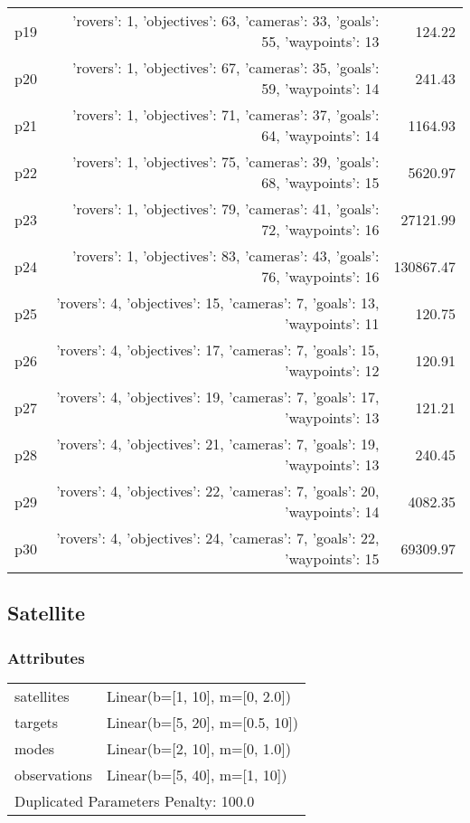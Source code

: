 \documentclass{article}
\begin{document}
\begin{center}
\begin{tabular}{@{}l|r|r@{}}
  p19&{'rovers': 1, 'objectives': 63, 'cameras': 33, 'goals': 55, 'waypoints': 13}&124.22\\
  p20&{'rovers': 1, 'objectives': 67, 'cameras': 35, 'goals': 59, 'waypoints': 14}&241.43\\
  p21&{'rovers': 1, 'objectives': 71, 'cameras': 37, 'goals': 64, 'waypoints': 14}&1164.93\\
  p22&{'rovers': 1, 'objectives': 75, 'cameras': 39, 'goals': 68, 'waypoints': 15}&5620.97\\
  p23&{'rovers': 1, 'objectives': 79, 'cameras': 41, 'goals': 72, 'waypoints': 16}&27121.99\\
  p24&{'rovers': 1, 'objectives': 83, 'cameras': 43, 'goals': 76, 'waypoints': 16}&130867.47\\
  p25&{'rovers': 4, 'objectives': 15, 'cameras': 7, 'goals': 13, 'waypoints': 11}&120.75\\
  p26&{'rovers': 4, 'objectives': 17, 'cameras': 7, 'goals': 15, 'waypoints': 12}&120.91\\
  p27&{'rovers': 4, 'objectives': 19, 'cameras': 7, 'goals': 17, 'waypoints': 13}&121.21\\
  p28&{'rovers': 4, 'objectives': 21, 'cameras': 7, 'goals': 19, 'waypoints': 13}&240.45\\
  p29&{'rovers': 4, 'objectives': 22, 'cameras': 7, 'goals': 20, 'waypoints': 14}&4082.35\\
  p30&{'rovers': 4, 'objectives': 24, 'cameras': 7, 'goals': 22, 'waypoints': 15}&69309.97
                            \end{tabular}
                            \end{center}
                    
                            \newpage \subsection{Satellite}
                    \subsubsection*{Attributes}
                    \begin{tabular}{@{}p{}p{}@{}}
                    \toprule
                    satellites & Linear(b=[1, 10], m=[0, 2.0])\\
targets & Linear(b=[5, 20], m=[0.5, 10])\\
modes & Linear(b=[2, 10], m=[0, 1.0])\\
observations & Linear(b=[5, 40], m=[1, 10]) \\
                    \bottomrule
                    \multicolumn{2}{l}{Duplicated Parameters Penalty: 100.0}
                    \end{tabular}
                
\end{document}
